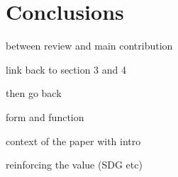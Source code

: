 \section{Conclusions}
\label{sec:conclusions}


between review and main contribution



link back to section 3 and 4

then go back

form and function

context of the paper with intro


reinforcing the value (SDG etc)











